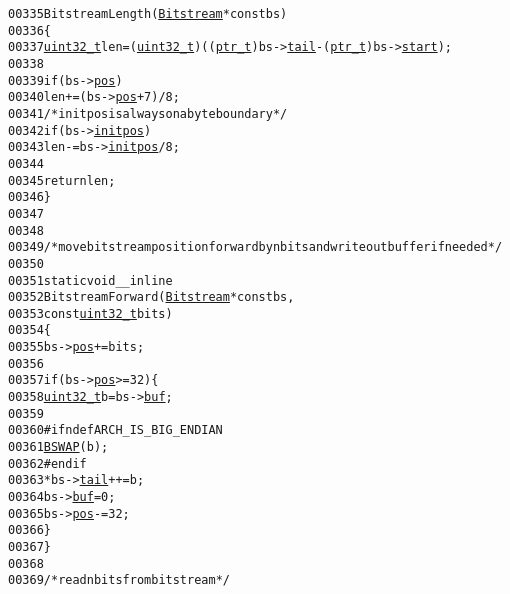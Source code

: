 \begin{footnotesize}
\begin{alltt}
00335 BitstreamLength(\hyperlink{struct_bitstream}{Bitstream} * \textcolor{keyword}{const} bs)
00336 \{
00337         \hyperlink{_types_8h_a04909d1366bb244ff2482beb51635f37}{uint32_t} len = (\hyperlink{_types_8h_a04909d1366bb244ff2482beb51635f37}{uint32_t})((\hyperlink{_types_8h_a9c9021e43aafc3d7fd2068cd742bad2c}{ptr_t})bs->\hyperlink{struct_bitstream_addd740548c260796cf01e55597f749c6}{tail} - (\hyperlink{_types_8h_a9c9021e43aafc3d7fd2068cd742bad2c}{ptr_t})bs->\hyperlink{struct_bitstream_a4c2cb09a4fee7ed90d05f8b40914911e}{start});
00338 
00339     \textcolor{keywordflow}{if} (bs->\hyperlink{struct_bitstream_ac7479c4c4e57d10bbfdd90baf6e731a4}{pos})
00340         len += (bs->\hyperlink{struct_bitstream_ac7479c4c4e57d10bbfdd90baf6e731a4}{pos} + 7) / 8;
00341         \textcolor{comment}{/* initpos is always on a byte boundary */}
00342         \textcolor{keywordflow}{if} (bs->\hyperlink{struct_bitstream_a3234ef24b4ec8a9d06731d4f2db67418}{initpos})
00343                 len -= bs->\hyperlink{struct_bitstream_a3234ef24b4ec8a9d06731d4f2db67418}{initpos}/8;
00344 
00345         \textcolor{keywordflow}{return} len;
00346 \}
00347 
00348 
00349 \textcolor{comment}{/* move bitstream position forward by n bits and write out buffer if needed */}
00350 
00351 \textcolor{keyword}{static} \textcolor{keywordtype}{void} \_\_inline
00352 BitstreamForward(\hyperlink{struct_bitstream}{Bitstream} * \textcolor{keyword}{const} bs,
00353                                  \textcolor{keyword}{const} \hyperlink{_types_8h_a04909d1366bb244ff2482beb51635f37}{uint32_t} bits)
00354 \{
00355         bs->\hyperlink{struct_bitstream_ac7479c4c4e57d10bbfdd90baf6e731a4}{pos} += bits;
00356 
00357         \textcolor{keywordflow}{if} (bs->\hyperlink{struct_bitstream_ac7479c4c4e57d10bbfdd90baf6e731a4}{pos} >= 32) \{
00358                 \hyperlink{_types_8h_a04909d1366bb244ff2482beb51635f37}{uint32_t} b = bs->\hyperlink{struct_bitstream_aa6e7d5fa7c3bcfaac4cda5c4b07f8aa1}{buf};
00359 
00360 \textcolor{preprocessor}{#ifndef ARCH\_IS\_BIG\_ENDIAN}
00361 \textcolor{preprocessor}{}                \hyperlink{_macros_8h_acd886eee9738d4807d25c1baac1e839e}{BSWAP}(b);
00362 \textcolor{preprocessor}{#endif}
00363 \textcolor{preprocessor}{}                *bs->\hyperlink{struct_bitstream_addd740548c260796cf01e55597f749c6}{tail}++ = b;
00364                 bs->\hyperlink{struct_bitstream_aa6e7d5fa7c3bcfaac4cda5c4b07f8aa1}{buf} = 0;
00365                 bs->\hyperlink{struct_bitstream_ac7479c4c4e57d10bbfdd90baf6e731a4}{pos} -= 32;
00366         \}
00367 \}
00368 
00369 \textcolor{comment}{/* read n bits from bitstream */}

\end{alltt}
\end{footnotesize}
